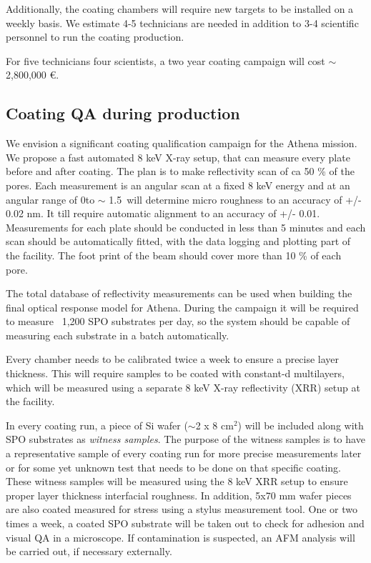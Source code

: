 Additionally, the coating chambers will require new targets to be installed on a weekly basis. We estimate 4-5 technicians are needed in addition to 3-4 scientific personnel to run the coating production.

For five technicians four scientists, a two year coating campaign will cost $\sim$2,800,000 \euro.


\subsection{Coating QA during production}\label{qualification}
We envision a significant coating qualification campaign for the Athena mission. We propose a fast automated 8 keV X-ray setup, that can measure every plate before and after coating. The plan is to make reflectivity scan of ca 50 \% of the pores.  Each measurement is an angular scan  at a fixed 8 keV energy and at an angular range of 0\degr to $\sim$ 1.5\degr\ will determine micro roughness to an accuracy of +/- 0.02 nm. It till require automatic alignment to an accuracy of +/- 0.01\degr. Measurements for each plate should be conducted in less than 5 minutes and each scan should be automatically fitted, with the data logging and plotting part of the facility. The foot print of the beam should cover more than 10 \% of each pore.

The total database of reflectivity measurements can be used when building the final optical response model for Athena. During the campaign it will be required to measure ~1,200 SPO substrates per day, so the system should be capable of measuring each substrate in a batch automatically.

Every chamber needs to be calibrated twice a week to ensure a precise layer thickness. This will require samples to be coated with constant-d multilayers, which will be measured using a separate 8 keV X-ray reflectivity (XRR) setup at the facility.

In every coating run, a piece of Si wafer ($\sim$2 x 8 cm$^2$) will be included along with SPO substrates as \emph{witness samples}. The purpose of the witness samples is to have a representative sample of every coating run for more precise measurements later or for some yet unknown test that needs to be done on that specific coating. These witness samples will be measured using the 8 keV XRR setup to ensure proper layer thickness interfacial roughness. In addition, 5x70 mm wafer pieces are also coated measured for stress using a stylus measurement tool. One or two times a week, a coated SPO substrate will be taken out to check for adhesion and visual QA in a microscope. If contamination is suspected, an AFM analysis will be carried out, if necessary externally.

